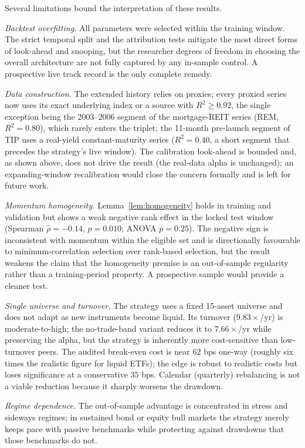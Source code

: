 Several limitations bound the interpretation of these results.

\textit{Backtest overfitting.}
All parameters were selected within the training window. The strict temporal split
and the attribution tests mitigate the most direct forms of look-ahead and
snooping, but the researcher degrees of freedom in choosing the overall
architecture are not fully captured by any in-sample control. A prospective live
track record is the only complete remedy.

\textit{Data construction.}
The extended history relies on proxies; every proxied series now uses its exact
underlying index or a source with $R^2 \geq 0.92$, the single exception being the
2003--2006 segment of the mortgage-REIT series (REM, $R^2 = 0.80$), which rarely
enters the triplet; the 11-month pre-launch segment of TIP uses a real-yield
constant-maturity series ($R^2 = 0.40$, a short segment that precedes the strategy's
live window). The calibration look-ahead is bounded and, as shown above, does not
drive the result (the real-data alpha is unchanged); an expanding-window
recalibration would close the concern formally and is left for future work.

\textit{Momentum homogeneity.}
Lemma~\ref{lem:homogeneity} holds in training and validation but shows a weak
negative rank effect in the locked test window (Spearman $\hat{\rho} = -0.14$,
$p = 0.010$; ANOVA $p = 0.25$). The negative sign is inconsistent with momentum
within the eligible set and is directionally favourable to minimum-correlation
selection over rank-based selection, but the result weakens the claim that the
homogeneity premise is an out-of-sample regularity rather than a training-period
property. A prospective sample would provide a cleaner test.

\textit{Single universe and turnover.}
The strategy uses a fixed 15-asset universe and does not adapt as new instruments
become liquid. Its turnover ($9.83\times$/yr) is moderate-to-high; the no-trade-band
variant reduces it to $7.66\times$/yr while preserving the alpha, but the strategy is
inherently more cost-sensitive than low-turnover peers. The audited break-even cost
is near $62$ bps one-way (roughly six times the realistic figure for liquid
ETFs); the edge is robust to realistic costs but loses significance at a conservative
$35$ bps. Calendar (quarterly) rebalancing is not a viable reduction because it
sharply worsens the drawdown.

\textit{Regime dependence.}
The out-of-sample advantage is concentrated in stress and sideways regimes; in
sustained bond or equity bull markets the strategy merely keeps pace with passive
benchmarks while protecting against drawdowns that those benchmarks do not.

